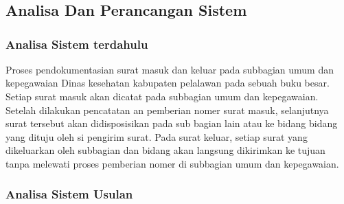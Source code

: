 %
%
%
%


\chapter{\babEmpat}
\section{Analisa Dan Perancangan Sistem }
\subsection{Analisa Sistem terdahulu}
Proses pendokumentasian surat masuk dan keluar pada subbagian umum dan kepegawaian Dinas kesehatan kabupaten pelalawan pada sebuah buku besar. Setiap surat masuk akan dicatat pada subbagian umum dan kepegawaian. Setelah dilakukan pencatatan an pemberian nomer surat masuk, selanjutnya surat tersebut akan didisposisikan pada sub bagian lain atau ke bidang bidang yang dituju oleh si pengirim surat.
Pada surat keluar, setiap surat yang dikeluarkan oleh subbagian dan bidang akan langsung dikirimkan ke tujuan tanpa melewati proses pemberian nomer di subbagian umum dan kepegawaian.


\subsection{Analisa Sistem Usulan}



